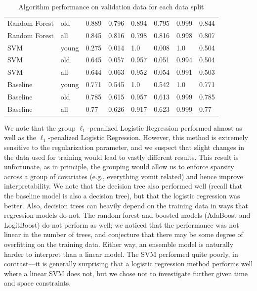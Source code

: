 \documentclass[11pt, letterpaper]{amsart}
\begin{document}
\begin{table}[h]
{\begin{tabular}{llllllll}
Random Forest  & old   & 0.889 & 0.796    & 0.894       & 0.795       & 0.999 & 0.844             \\
Random Forest  & all   & 0.845 & 0.816    & 0.798       & 0.816       & 0.998 & 0.807             \\
SVM            & young & 0.275 & 0.014    & 1.0         & 0.008       & 1.0   & 0.504             \\
SVM            & old   & 0.645 & 0.057    & 0.957       & 0.051       & 0.994 & 0.504             \\
SVM            & all   & 0.644 & 0.063    & 0.952       & 0.054       & 0.991 & 0.503             \\
Baseline       & young & 0.771 & 0.545    & 1.0         & 0.542       & 1.0   & 0.771             \\
Baseline       & old   & 0.785 & 0.615    & 0.957       & 0.613       & 0.999 & 0.785             \\
Baseline       & all   & 0.77  & 0.626    & 0.917       & 0.623       & 0.999 & 0.77             
\end{tabular} }
\caption{Algorithm performance on validation data for each data split}\label{tab:val_performance}
\end{table}

We note that the group $\ell_1$-penalized Logistic Regression performed almost as well as the $\ell_1$-penalized Logistic Regression. However, this method is extremely sensitive to the regularization parameter, and we suspect that slight changes in the data used for training would lead to vastly different results. This result is unfortunate, as in principle, the grouping would allow us to enforce sparsity across a group of covariates (e.g., everything vomit related) and hence improve interpretability. We note that the decision tree also performed well (recall that the baseline model is also a decision tree), but that the logistic regression was better. Also, decision trees can heavily depend on the training data in ways that regression models do not. The random forest and boosted models (AdaBoost and LogitBoost) do not perform as well; we noticed that the performance was not linear in the number of trees, and conjecture that there may be some degree of overfitting on the training data. Either way, an ensemble model is naturally harder to interpret than a linear model. The SVM performed quite poorly, in contrast---it is generally surprising that a logistic regression method performs well where a linear SVM does not, but we chose not to investigate further given time and space constraints. 
\end{document}

